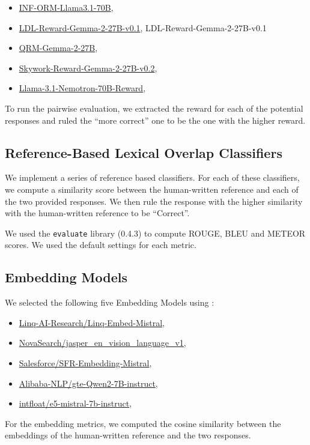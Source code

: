 \begin{itemize}
    \item \url{INF-ORM-Llama3.1-70B}, \citet{INF-ORM-Llama3.1-70B}
    \item \url{LDL-Reward-Gemma-2-27B-v0.1}, \citet{}{LDL-Reward-Gemma-2-27B-v0.1}
    \item \url{QRM-Gemma-2-27B}, \citet{dorka2024quantile}
    \item \url{Skywork-Reward-Gemma-2-27B-v0.2}, \citet{liu2024skywork}
    \item \url{Llama-3.1-Nemotron-70B-Reward}, \citet{wang2024helpsteer2preferencecomplementingratingspreferences,wang2024helpsteer2}
\end{itemize}

To run the pairwise evaluation, we extracted the reward for each of the potential responses and ruled the ``more correct'' one to be the one with the higher reward.

\subsection{Reference-Based Lexical Overlap Classifiers}
We implement a series of reference based classifiers. For each of these classifiers, we compute a similarity score between the human-written reference and each of the two provided responses. We then rule the response with the higher similarity with the human-written reference to be ``Correct''.

We used the \texttt{evaluate} library (0.4.3) \cite{evaluate} to compute ROUGE, BLEU and METEOR scores. We used the default settings for each metric. 

\subsection{Embedding Models}

We selected the following five Embedding Models using \cite{mteb}:
\begin{itemize}
    \item \url{Linq-AI-Research/Linq-Embed-Mistral}, \citet{linq}
    \item \url{NovaSearch/jasper_en_vision_language_v1}, \citet{zhang2024jasper}
    \item \url{Salesforce/SFR-Embedding-Mistral}, \citet{SFRAIResearch2024}
    \item \url{Alibaba-NLP/gte-Qwen2-7B-instruct}, \citet{li2023towards}
    \item \url{intfloat/e5-mistral-7b-instruct}, \citet{wang2023improving,wang2022text}
\end{itemize}
For the embedding metrics, we computed the cosine similarity between the embeddings of the human-written reference and the two responses.




